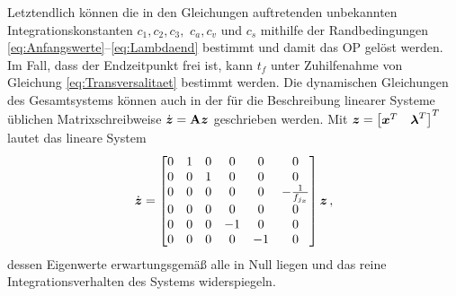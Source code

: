 Letztendlich können die in den Gleichungen auftretenden unbekannten Integrationskonstanten $c_1, c_2, c_3,$ $c_a, c_v$ und $c_s$ mithilfe der Randbedingungen \eqref{eq:Anfangswerte}--\eqref{eq:Lambdaend} bestimmt und damit das \gls{OP} gelöst werden. Im Fall, dass der Endzeitpunkt frei ist, kann $t_f$ unter Zuhilfenahme von Gleichung \eqref{eq:Transversalitaet} bestimmt werden. Die dynamischen Gleichungen des Gesamtsystems können auch in der für die Beschreibung linearer Systeme üblichen Matrixschreibweise $\dot{\boldsymbol{z}} = {\boldsymbol{\mathrm{A}}}\boldsymbol{z}$ geschrieben werden. Mit $\boldsymbol{z} = \begin{bmatrix}\boldsymbol{x}^T & \boldsymbol{\lambda}^T\end{bmatrix}^T$ lautet das lineare System \begin{equation}
	\dot{\boldsymbol{z}} = \begin{bmatrix}
	0 & 1 & 0 & 0 & 0 & 0 \\
	0 & 0 & 1 & 0 & 0 & 0 \\
	0 & 0 & 0 & 0 & 0 & -\frac{1}{f_{j_x}} \\
	0 & 0 & 0 & 0 & 0 & 0 \\
	0 & 0 & 0 & -1 & 0 & 0 \\
	0 & 0 & 0 & 0 & -1 & 0 \\
	\end{bmatrix}\boldsymbol{z}\,,
\end{equation}
dessen Eigenwerte erwartungsgemäß alle in Null liegen und das reine Integrationsverhalten des Systems widerspiegeln.

